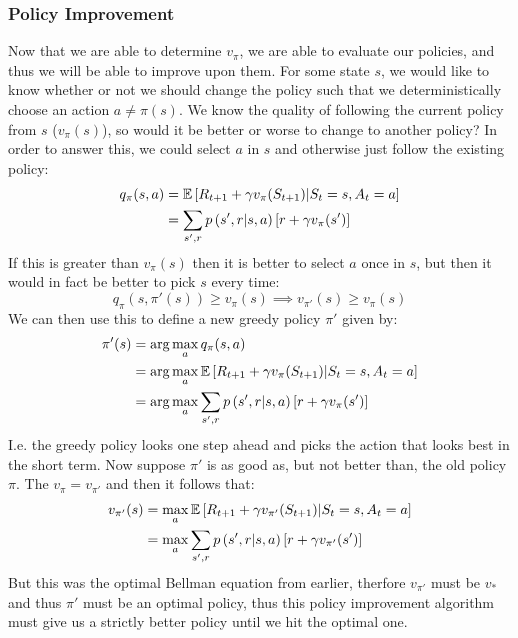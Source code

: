    \subsubsection{Policy Improvement}
    Now that we are able to determine $v_\pi$, we are able to evaluate our 
    policies, and thus we will be able to improve upon them. For some state 
    $s$, we would like to know whether or not we should change the policy such 
    that we deterministically choose an action $a\neq \pi(s)$. We know the 
    quality of following the current policy from $s$ ($v_\pi(s)$), so would it 
    be better or worse to change to another policy? In order to answer this, we 
    could select $a$ in $s$ and otherwise just follow the existing policy:
    \begin{align*}
        q_\pi(s,a)&=\mathbb{E}\left[R_{t+1}+\gamma v_\pi(S_{t+1}) \middle\vert S_t=s, 
        A_t=a\right]\\
            &= \sum_{s',r}p\left(s',r \middle\vert s,a\right)\left[r+\gamma 
            v_\pi(s')\right]
    \end{align*}
    If this is greater than $v_\pi(s)$ then it is better to select $a$ once in 
    $s$, but then it would in fact be better to pick $s$ every time:
    \begin{equation*}
        q_\pi(s,\pi'(s)) \geq v_\pi(s) \implies v_{\pi'}(s) \geq v_\pi(s)
    \end{equation*}
    We can then use this to define a new greedy policy $\pi'$ given by:
    \begin{align*}
        \pi'(s)&=\arg\max_a q_\pi(s,a)\\
            &=\arg\max_a \mathbb{E}\left[R_{t+1} + \gamma v_\pi(S_{t+1}) \middle\vert S_t=s, 
            A_t=a \right]\\
            &=\arg\max_a \sum_{s',r}p\left(s',r \middle\vert s,a\right)\left[r+\gamma 
            v_\pi(s')\right]
    \end{align*}
    I.e. the greedy policy looks one step ahead and picks the action that looks 
    best in the short term. Now suppose $\pi'$ is as good as, but not better 
    than, the old policy $\pi$. The $v_\pi=v_{\pi'}$ and then it follows that:
    \begin{align*}
        v_{\pi'}(s)&=\max_a\mathbb{E}\left[R_{t+1}+\gamma v_{\pi'}(S_{t+1}) \middle\vert 
        S_t=s, A_t=a \right]\\
            &= \max_a \sum_{s',r}p\left(s',r \middle\vert s,a \right)\left[r+\gamma 
            v_{\pi'}(s')\right]
    \end{align*}
    But this was the optimal Bellman equation from earlier, therfore $v_{\pi'}$ 
    must be $v_*$ and thus $\pi'$ must be an optimal policy, thus this policy 
    improvement algorithm must give us a strictly better policy until we hit 
    the optimal one.
    

